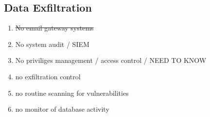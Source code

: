 \documentclass[a4paper]{article}
\begin{document}
	\subsection{Data Exfiltration}
	
	
	


	\begin{enumerate}
		\item \st{No email gateway systems}
		\item No system audit / SIEM
		\item No priviliges management / access control / NEED TO KNOW
		\item no exfiltration control
		\item no routine scanning for vulnerabilities
		\item no monitor of database activity
	\end{enumerate}
	
\end{document}
